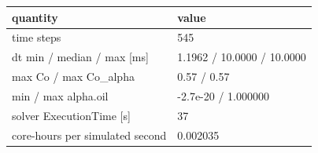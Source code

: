 \documentclass[11pt,english]{article}
\begin{document}
\begin{longtable}[]{@{}ll@{}}
\toprule\noalign{}
quantity & value \\
\midrule\noalign{}
\endhead
\bottomrule\noalign{}
\endlastfoot
time steps & 545 \\
dt min / median / max {[}ms{]} & 1.1962 / 10.0000 / 10.0000 \\
max Co / max Co\_alpha & 0.57 / 0.57 \\
min / max alpha.oil & -2.7e-20 / 1.000000 \\
solver ExecutionTime {[}s{]} & 37 \\
core-hours per simulated second & 0.002035 \\
\end{longtable}




\end{document}
